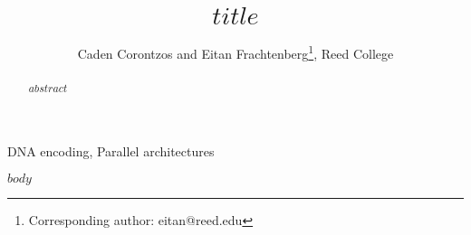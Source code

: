 \documentclass[lettersize,10pt,journal]{IEEEtran}
\begin{document}
\title{$title$}

\author{Caden Corontzos and Eitan Frachtenberg\thanks{Corresponding author: eitan@reed.edu}, Reed College}


\maketitle

\begin{abstract}
$abstract$
\end{abstract}

\begin{IEEEkeywords}
  DNA encoding, Parallel architectures
\end{IEEEkeywords}

$body$




\end{document}
